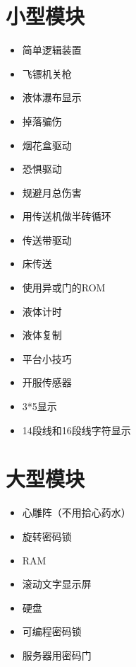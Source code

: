 \section{小型模块}
\begin{maybecols}
\begin{itemize}
\item {} 简单逻辑装置 
\item {}飞镖机关枪 
\item {} 液体瀑布显示 
\item {} 掉落骗伤  
\item {} 烟花盒驱动 
\item {} 恐惧驱动 
\item {} 规避月总伤害 
\item {} 用传送机做半砖循环 
\item {} 传送带驱动 
\item {} 床传送 
\item {} 使用异或门的ROM 
\item {} 液体计时 
\item {} 液体复制 
\item {} 平台小技巧 
\item {} 开服传感器 
\item {} 3*5显示 
\item {} 14段线和16段线字符显示 
\end{itemize}
\end{maybecols}

\section{大型模块}
\begin{maybecols}
\begin{itemize}
\item {} 心雕阵（不用拾心药水）
\item {} 旋转密码锁 
\item {} RAM 
\item {} 滚动文字显示屏 
\item {} 硬盘 
\item {} 可编程密码锁 
\item {} 服务器用密码门 
\end{itemize}
\end{maybecols}

